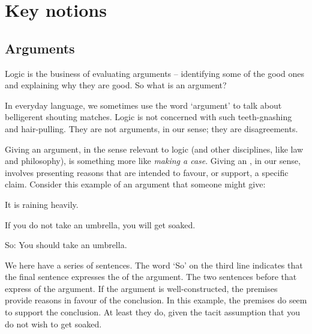 

\part{Key notions}
\label{ch.intro}


\chapter{Arguments}\label{argRaining}\label{s:Arguments}
Logic is the business of evaluating arguments – identifying some of the good ones and explaining why they are good. So what is an argument?

In everyday language, we sometimes use the word `argument' to talk about belligerent shouting matches. Logic is not concerned with such teeth-gnashing and hair-pulling. They are not arguments, in our sense; they are disagreements. 

Giving an argument, in the sense relevant to logic (and other disciplines, like law and philosophy), is something more like \emph{making a case}. Giving an , in our sense, involves presenting reasons that are intended to favour, or support, a specific claim. Consider this example of an argument that someone might give:
	\begin{earg}
		\item[] It is raining heavily.
		\item[] If you do not take an umbrella, you will get soaked.
		\item[So:] You should take an umbrella.
	\end{earg}
We here have a series of sentences. The word `So' on the third line indicates that the final sentence expresses the  of the argument. The two sentences before that express  of the argument. If the argument is well-constructed, the premises provide reasons in favour of the conclusion. In this example, the premises do seem to support the conclusion. At least they do, given the tacit assumption that you do not wish to get soaked.

